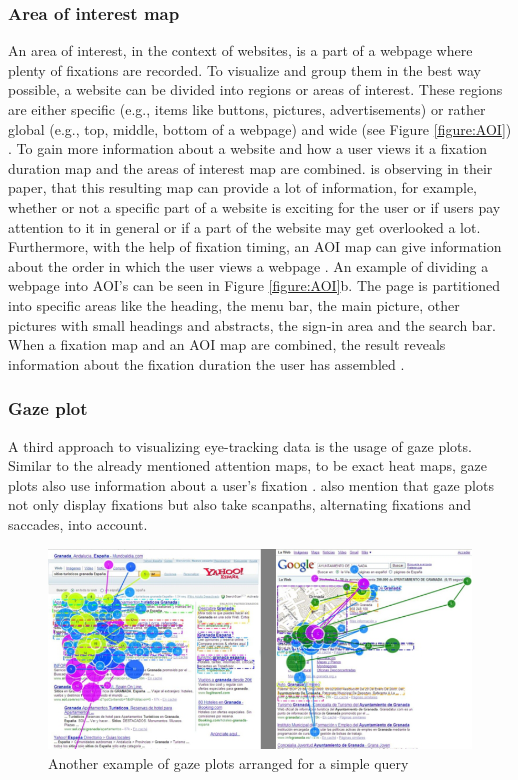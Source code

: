 \subsubsection{Area of interest map}
An area of interest, in the context of websites, is a part of a webpage where plenty of fixations are recorded. To visualize and group them in the best way possible, a website can be divided into regions or areas of interest. These regions are either specific (e.g., items like buttons, pictures, advertisements) or rather global (e.g., top, middle, bottom of a webpage) and wide (see Figure \ref{figure:AOI}) \autocite[]{gonzalez2011different, djamasbi2014eye}. To gain more information about a website and how a user views it a fixation duration map and the areas of interest map are combined.
\textcite{djamasbi2014eye} is observing in their paper, that this resulting map can provide a lot of information, for example, whether or not a specific part of a website is exciting for the user or if users pay attention to it in general or if a part of the website may get overlooked a lot. Furthermore, with the help of fixation timing, an AOI map can give information about the order in which the user views a webpage \autocite[]{djamasbi2014eye}.
An example of dividing a webpage into AOI's can be seen in Figure \ref{figure:AOI}b. The page is partitioned into specific areas like the heading, the menu bar, the main picture, other pictures with small headings and abstracts, the sign-in area and the search bar. When a fixation map and an AOI map are combined, the result reveals information about the fixation duration the user has assembled \autocite{djamasbi2014eye}.

\subsubsection{Gaze plot}
A third approach to visualizing eye-tracking data is the usage of gaze plots. Similar to the already mentioned attention maps, to be exact heat maps, gaze plots also use information about a user's fixation \autocite[]{kurzhals2016gaze}. \textcite[]{kurzhals2016gaze} also mention that gaze plots not only display fixations but also take scanpaths, alternating fixations and saccades, into account. 

\begin{figure}[!ht]
    \centering
    \includegraphics[width=1\linewidth]{images/GazePlot_gonzalez2011different.png}
    \caption{
       Another example of gaze plots arranged for a simple query \autocite[12]{gonzalez2011different}
    }
    \label{figure:GazePlot}
\end{figure}

